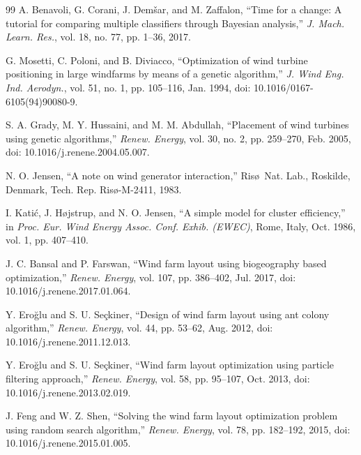 {\begin{thebibliography}{99}
A. Benavoli, G. Corani, J. Dem\v{s}ar, and M. Zaffalon, ``Time for a change: A tutorial for comparing multiple classifiers through Bayesian analysis,'' \textit{J. Mach. Learn. Res.}, vol. 18, no. 77, pp. 1--36, 2017.

G. Mosetti, C. Poloni, and B. Diviacco, ``Optimization of wind turbine positioning in large windfarms by means of a genetic algorithm,'' \textit{J. Wind Eng. Ind. Aerodyn.}, vol. 51, no. 1, pp. 105--116, Jan. 1994, doi: 10.1016/0167-6105(94)90080-9.

S. A. Grady, M. Y. Hussaini, and M. M. Abdullah, ``Placement of wind turbines using genetic algorithms,'' \textit{Renew. Energy}, vol. 30, no. 2, pp. 259--270, Feb. 2005, doi: 10.1016/j.renene.2004.05.007.

N. O. Jensen, ``A note on wind generator interaction,'' Ris\o\ Nat. Lab., Roskilde, Denmark, Tech. Rep. Ris\o-M-2411, 1983.

I. Kati\'c, J. H\o jstrup, and N. O. Jensen, ``A simple model for cluster efficiency,'' in \textit{Proc. Eur. Wind Energy Assoc. Conf. Exhib. (EWEC)}, Rome, Italy, Oct. 1986, vol. 1, pp. 407--410.

J. C. Bansal and P. Farswan, ``Wind farm layout using biogeography based optimization,'' \textit{Renew. Energy}, vol. 107, pp. 386--402, Jul. 2017, doi: 10.1016/j.renene.2017.01.064.

Y. Ero\u{g}lu and S. U. Se\c{c}kiner, ``Design of wind farm layout using ant colony algorithm,'' \textit{Renew. Energy}, vol. 44, pp. 53--62, Aug. 2012, doi: 10.1016/j.renene.2011.12.013.

Y. Ero\u{g}lu and S. U. Se\c{c}kiner, ``Wind farm layout optimization using particle filtering approach,'' \textit{Renew. Energy}, vol. 58, pp. 95--107, Oct. 2013, doi: 10.1016/j.renene.2013.02.019.

J. Feng and W. Z. Shen, ``Solving the wind farm layout optimization problem using random search algorithm,'' \textit{Renew. Energy}, vol. 78, pp. 182--192, 2015, doi: 10.1016/j.renene.2015.01.005.


\end{thebibliography}}
